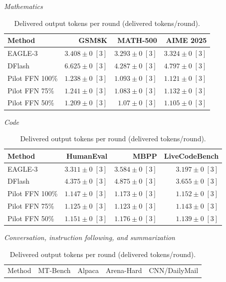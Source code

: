 \documentclass[conference,onecolumn]{IEEEtran}
\begin{document}
\begin{table}[!htp]
\centering\small
\setlength{\tabcolsep}{3pt}
\caption{Delivered output tokens per round (delivered tokens/round).}
\label{tab:appendix-metric-returned-round-none}
\textit{Mathematics}\par\smallskip
\begin{tabular}{@{}>{\raggedright\arraybackslash}p{3.7cm}rrr@{}}
\toprule
Method & GSM8K & MATH-500 & AIME 2025 \\
\midrule
EAGLE-3 & \(3.408 \pm 0\;[3]\) & \(3.293 \pm 0\;[3]\) & \(3.324 \pm 0\;[3]\) \\
DFlash & \(\mathbf{6.625} \pm 0\;[3]\) & \(\mathbf{4.287} \pm 0\;[3]\) & \(\mathbf{4.797} \pm 0\;[3]\) \\
Pilot FFN 100\% & \(1.238 \pm 0\;[3]\) & \(1.093 \pm 0\;[3]\) & \(1.121 \pm 0\;[3]\) \\
Pilot FFN 75\% & \(1.241 \pm 0\;[3]\) & \(1.083 \pm 0\;[3]\) & \(1.132 \pm 0\;[3]\) \\
Pilot FFN 50\% & \(1.209 \pm 0\;[3]\) & \(1.07 \pm 0\;[3]\) & \(1.105 \pm 0\;[3]\) \\
\bottomrule
\end{tabular}\par\medskip
\textit{Code}\par\smallskip
\begin{tabular}{@{}>{\raggedright\arraybackslash}p{3.7cm}rrr@{}}
\toprule
Method & HumanEval & MBPP & LiveCodeBench \\
\midrule
EAGLE-3 & \(3.311 \pm 0\;[3]\) & \(3.584 \pm 0\;[3]\) & \(3.197 \pm 0\;[3]\) \\
DFlash & \(\mathbf{4.375} \pm 0\;[3]\) & \(\mathbf{4.875} \pm 0\;[3]\) & \(\mathbf{3.655} \pm 0\;[3]\) \\
Pilot FFN 100\% & \(1.147 \pm 0\;[3]\) & \(1.173 \pm 0\;[3]\) & \(1.152 \pm 0\;[3]\) \\
Pilot FFN 75\% & \(1.125 \pm 0\;[3]\) & \(1.123 \pm 0\;[3]\) & \(1.143 \pm 0\;[3]\) \\
Pilot FFN 50\% & \(1.151 \pm 0\;[3]\) & \(1.176 \pm 0\;[3]\) & \(1.139 \pm 0\;[3]\) \\
\bottomrule
\end{tabular}\par\medskip
\textit{Conversation, instruction following, and summarization}\par\smallskip
\begin{tabular}{@{}>{\raggedright\arraybackslash}p{3.7cm}rrrr@{}}
\toprule
Method & MT-Bench & Alpaca & Arena-Hard & CNN/DailyMail \\

\end{tabular}
\end{table}
\end{document}
